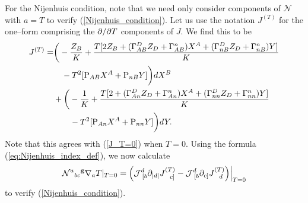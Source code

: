 For the Nijenhuis condition, note that we need only consider components of $\mathcal{N}$ with $a=T$ to verify (\ref{Nijenhuis_condition}). Let us use the notation $J^{(T)}$ for the one--form comprising the $\partial/\partial T$ components of $J$. We find this to be
\[
\begin{split}
J^{(T)}=&\bigg(-\frac{Z_B}{K} + \frac{T[2Z_B + (\Gamma^D_{AB}Z_D+\Gamma^n_{AB})X^A + (\Gamma^D_{nB}Z_D+\Gamma^n_{nB})Y]}{K} \\
&\quad - T^2[\mathrm{P}_{AB}X^A+\mathrm{P}_{nB}Y]\bigg)dX^B \\
&+\bigg(-\frac{1}{K} + \frac{T[2 + (\Gamma^D_{An}Z_D+\Gamma^n_{An})X^A + (\Gamma^D_{nn}Z_D+\Gamma^n_{nn})Y]}{K} \\
&\qquad - T^2[\mathrm{P}_{An}X^A+\mathrm{P}_{nn}Y]\bigg)dY.
\end{split}
\]
Note that this agrees with (\ref{J_T=0}) when $T=0$. Using the formula (\ref{eq:Nijenhuis_index_def}), we now calculate
\[
{\mathcal{N}^{a}}_{bc}{^{\bf g}}\nabla_a T|_{T=0}=\Big(\mathcal{J}^d_{\ [b}\p_{|d|}J^{(T)}_{\ \ c]}-\mathcal{J}^d_{\ [b}\p_{c]}J^{(T)}_{\ \ d}\Big)\Big|_{T=0}
\]
to verify (\ref{Nijenhuis_condition}).

\koniec

